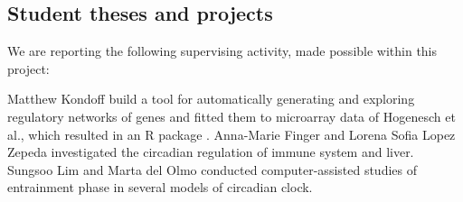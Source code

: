 \documentclass[a4paper]{article}
\begin{document}
\subsection{Student theses and projects}
We are reporting the following supervising activity, made possible
within this project:

Matthew Kondoff build a tool for automatically generating and
exploring regulatory networks of genes and fitted them to microarray
data of Hogenesch et al., which resulted in an R package
\cite{kondoff2015modeling}. Anna-Marie Finger and Lorena Sofia Lopez
Zepeda investigated the circadian regulation of immune system and
liver. Sungsoo Lim and Marta del Olmo conducted computer-assisted
studies of entrainment phase in several models of circadian clock.




\end{document}
